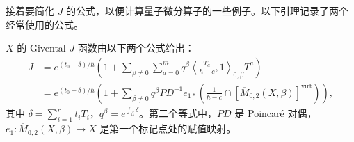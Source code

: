 接着要简化 $J$ 的公式，以便计算量子微分算子的一些例子。以下引理记录了两个经常使用的公式。
\begin{lemma}\label{lem:giventals-j-two-formulas}
$X$ 的 Givental $J$ 函数由以下两个公式给出：
\[
\begin{aligned}
J&=e^{(t_0+\delta)/\hbar}\left(1+\sum_{\beta\ne0}\sum_{a=0}^m q^\beta
\left\langle\frac{T_a}{\hbar-c},1\right\rangle_{0,\beta}T^a\right)\\
&=e^{(t_0+\delta)/\hbar}\left(1+\sum_{\beta\ne0}q^\beta PD^{-1}e_{1*}
\left(\frac1{\hbar-c}\cap[\overline M_{0,2}(X,\beta)]^{\mathrm{virt}}\right)\right),
\end{aligned}
\]
其中 $\delta=\sum_{i=1}^rt_iT_i$，$q^\beta=e^{\int_\beta\delta}$。第二个等式中，$PD$ 是 Poincaré 对偶，$e_1:\overline M_{0,2}(X,\beta)\to X$ 是第一个标记点处的赋值映射。
\end{lemma}
